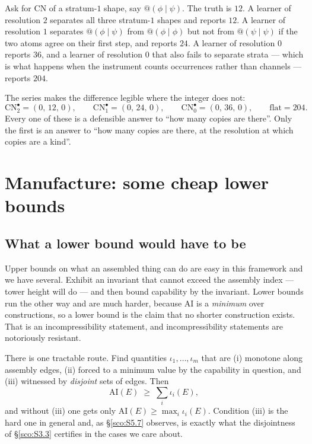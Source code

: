 \documentclass[11pt]{article}
\makeatletter
\theoremstyle{plain}
\theoremstyle{definition}
\theoremstyle{remark}
\newcommand{\quo}[1]{@#1}
\newcommand{\AI}{\mathrm{AI}}
\newcommand{\CN}{\mathrm{CN}}
\makeatother
\begin{document}
Ask for $\CN$ of a stratum-$1$ shape, say $\quo{(\phi \mid \psi)}$. The
truth is $12$. A learner of resolution $2$ separates all three stratum-$1$
shapes and reports $12$. A learner of resolution $1$ separates
$\quo{(\phi\mid\psi)}$ from $\quo{(\phi\mid\phi)}$ but not from
$\quo{(\psi\mid\psi)}$ if the two atoms agree on their first step, and
reports $24$. A learner of resolution $0$ reports $36$, and a learner of
resolution $0$ that also fails to separate strata --- which is what
happens when the instrument counts occurrences rather than channels ---
reports $204$.

The series makes the difference legible where the integer does not:
\[
  \CN_2^{\bullet} = (0,\,12,\,0), \qquad
  \CN_1^{\bullet} = (0,\,24,\,0), \qquad
  \CN_0^{\bullet} = (0,\,36,\,0), \qquad
  \text{flat} = 204 .
\]
Every one of these is a defensible answer to ``how many copies are
there''. Only the first is an answer to ``how many copies are there, at
the resolution at which copies are a kind''.

\section{Manufacture: some cheap lower bounds}\label{sco:S5}

\subsection{What a lower bound would have to be}\label{sco:S5.1}

Upper bounds on what an assembled thing can do are easy in this framework
and we have several. Exhibit an invariant that cannot exceed the assembly
index --- tower height will do --- and then bound capability by the
invariant. Lower bounds run the other way and are much harder, because
$\AI$ is a \emph{minimum} over constructions, so a lower bound is the
claim that no shorter construction exists. That is an incompressibility
statement, and incompressibility statements are notoriously resistant.

There is one tractable route. Find quantities $\iota_1, \dots,
\iota_m$ that are (i) monotone along assembly edges, (ii) forced to a
minimum value by the capability in question, and (iii) witnessed by
\emph{disjoint} sets of edges. Then
\[
  \AI(E) \;\ge\; \sum_i \iota_i(E),
\]
and without (iii) one gets only $\AI(E) \ge \max_i \iota_i(E)$.
Condition (iii) is the hard one in general and, as \S\ref{sco:S5.7}
observes, is exactly what the disjointness of \S\ref{sco:S3.3} certifies
in the cases we care about.
\end{document}
